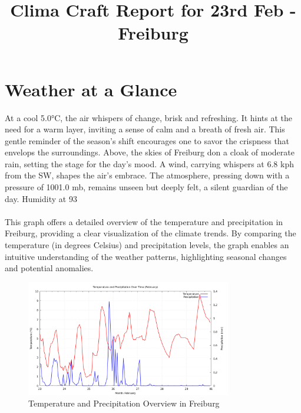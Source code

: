 \documentclass[11pt]{article}
\title{\textbf{\Huge Clima Craft Report for 23rd Feb - Freiburg}}  %
\date{}
\begin{document}
    \maketitle

    \thispagestyle{fancy}
    \section*{Weather at a Glance }
At a cool 5.0°C, the air whispers of change, brisk and refreshing. It hints at the need for a warm layer, inviting a sense of calm and a breath of fresh air. This gentle reminder of the season's shift encourages one to savor the crispness that envelops the surroundings. Above, the skies of Freiburg don a cloak of moderate rain, setting the stage for the day's mood. A wind, carrying whispers at 6.8 kph from the SW, shapes the air's embrace. The atmosphere, pressing down with a pressure of 1001.0 mb, remains unseen but deeply felt, a silent guardian of the day. Humidity at 93%
\paragraph{}This graph offers a detailed overview of the temperature and precipitation in Freiburg, providing a clear visualization of the climate trends. By comparing the temperature (in degrees Celsius) and precipitation levels, the graph enables an intuitive understanding of the weather patterns, highlighting seasonal changes and potential anomalies.
\begin{figure}[h]
\centering
\includegraphics[width=0.8\textwidth]{data/graph/temperature_precipitation_graph.png}
\caption{Temperature and Precipitation Overview in Freiburg}
\end{figure}
\end{document}
